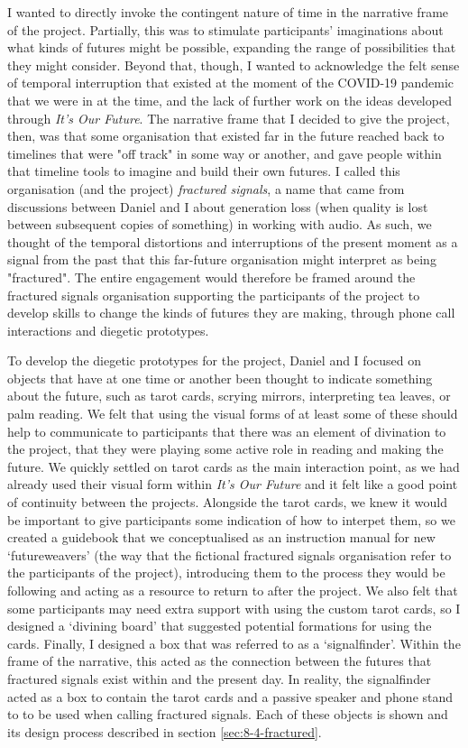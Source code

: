 I wanted to directly invoke the contingent nature of time in the narrative frame of the project. Partially, this was to stimulate participants' imaginations about what kinds of futures might be possible, expanding the range of possibilities that they might consider. Beyond that, though, I wanted to acknowledge the felt sense of temporal interruption that existed at the moment of the COVID-19 pandemic that we were in at the time, and the lack of further work on the ideas developed through \emph{It's Our Future}. The narrative frame that I decided to give the project, then, was that some organisation that existed far in the future reached back to timelines that were "off track" in some way or another, and gave people within that timeline tools to imagine and build their own futures. I called this organisation (and the project) \emph{fractured signals}, a name that came from discussions between Daniel and I about generation loss (when quality is lost between subsequent copies of something) in working with audio. As such, we thought of the temporal distortions and interruptions of the present moment as a signal from the past that this far-future organisation might interpret as being "fractured". The entire engagement would therefore be framed around the fractured signals organisation supporting the participants of the project to develop skills to change the kinds of futures they are making, through phone call interactions and diegetic prototypes.    

To develop the diegetic prototypes for the project, Daniel and I focused on objects that have at one time or another been thought to indicate something about the future, such as tarot cards, scrying mirrors, interpreting tea leaves, or palm reading. We felt that using the visual forms of at least some of these should help to communicate to participants that there was an element of divination to the project, that they were playing some active role in reading and making the future. We quickly settled on tarot cards as the main interaction point, as we had already used their visual form within \emph{It's Our Future} and it felt like a good point of continuity between the projects. Alongside the tarot cards, we knew it would be important to give participants some indication of how to interpet them, so we created a guidebook that we conceptualised as an instruction manual for new `futureweavers' (the way that the fictional fractured signals organisation refer to the participants of the project), introducing them to the process they would be following and acting as a resource to return to after the project. We also felt that some participants may need extra support with using the custom tarot cards, so I designed a `divining board' that suggested potential formations for using the cards. Finally, I designed a box that was referred to as a `signalfinder'. Within the frame of the narrative, this acted as the connection between the futures that fractured signals exist within and the present day. In reality, the signalfinder acted as a box to contain the tarot cards and a passive speaker and phone stand to to be used when calling fractured signals. Each of these objects is shown and its design process described  in section \ref{sec:8-4-fractured}.

